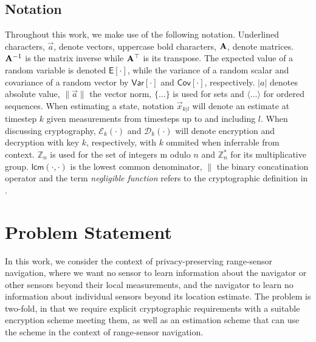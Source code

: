 \documentclass[10pt,letterpaper,oneside,twocolumn,journal]{IEEEtran}
\theoremstyle{definition}
\theoremstyle{definition}
\theoremstyle{remark}
\begin{document}
\subsection{Notation}
Throughout this work, we make use of the following notation. Underlined characters, $\vec{a}$, denote vectors, uppercase bold characters, ${{\mathbf{A}}}$, denote matrices. ${{\mathbf{A}}}^{-1}$ is the matrix inverse while ${{\mathbf{A}}}^\top$ is its transpose. The expected value of a random variable is denoted $\mathsf{E}[\cdot]$, while the variance of a random scalar and covariance of a random vector by $\mathsf{Var}[\cdot]$ and $\mathsf{Cov}[\cdot]$, respectively. $|a|$ denotes absolute value, $\lVert\vec{a}\rVert$ the vector norm, $\{\dots\}$ is used for sets and $\langle\dots\rangle$ for ordered sequences. When estimating a state, notation $\vec{x}_{k|l}$ will denote an estimate at timestep $k$ given measurements from timesteps up to and including $l$. When discussing cryptography, $\mathcal{E}_{k}(\cdot)$ and $\mathcal{D}_{k}(\cdot)$ will denote encryption and decryption with key $k$, respectively, with $k$ ommited when inferrable from context. $\mathbb{Z}_n$ is used for the set of integers m  odulo $n$ and $\mathbb{Z}^*_n$ for its multiplicative group. $\mathsf{lcm}(\cdot,\cdot)$ is the lowest common denominator, $\|$ the binary concatination operator and the term \textit{negligible function} refers to the cryptographic definition in \cite{katzIntroductionModernCryptography2008}.

% 
%                                                                                
%                                                                                
%                                                                                
% 

\section{Problem Statement} \label{sec:problem_statement}
In this work, we consider the context of privacy-preserving range-sensor navigation, where we want no sensor to learn information about the navigator or other sensors beyond their local measurements, and the navigator to learn no information about individual sensors beyond its location estimate. The problem is two-fold, in that we require explicit cryptographic requirements with a suitable encryption scheme meeting them, as well as an estimation scheme that can use the scheme in the context of range-sensor navigation.
\end{document}
